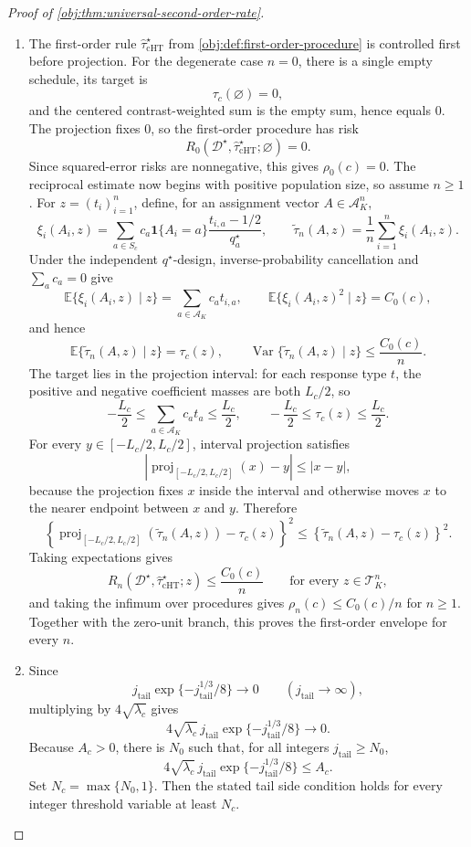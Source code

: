 \begin{proof}[Proof of \cref{obj:thm:universal-second-order-rate}]
\begin{enumerate}
\item The first-order rule \(\widehat\tau_{\mathrm{cHT}}^\star\) from \cref{obj:def:first-order-procedure} is controlled first before projection. For the degenerate case \(n=0\), there is a single empty schedule, its target is
\[
\tau_c(\varnothing)=0,
\]
and the centered contrast-weighted sum is the empty sum, hence equals \(0\). The projection fixes \(0\), so the first-order procedure has risk
\[
R_0(\mathcal D^\star,\widehat\tau_{\mathrm{cHT}}^\star;\varnothing)=0.
\]
Since squared-error risks are nonnegative, this gives \(\rho_0(c)=0\). The reciprocal estimate now begins with positive population size, so assume \(n\ge 1\). For \(z=(t_i)_{i=1}^n\), define, for an assignment vector \(A\in\mathcal A_K^n\),
\[
\xi_i(A_i,z)
=
\sum_{a\in S_c}
 c_a\mathbf 1\{A_i=a\}\frac{t_{i,a}-1/2}{q_a^\star},
\qquad
\widetilde\tau_n(A,z)=\frac1n\sum_{i=1}^n\xi_i(A_i,z).
\]
Under the independent \(q^\star\)-design, inverse-probability cancellation and \(\sum_a c_a=0\) give
\[
\mathbb E\{\xi_i(A_i,z)\mid z\}
=
\sum_{a\in\mathcal A_K} c_a t_{i,a},
\qquad
\mathbb E\{\xi_i(A_i,z)^2\mid z\}=C_0(c),
\]
and hence
\[
\mathbb E\{\widetilde\tau_n(A,z)\mid z\}=\tau_c(z),
\qquad
\operatorname{Var}\{\widetilde\tau_n(A,z)\mid z\}\le \frac{C_0(c)}{n}.
\]
The target lies in the projection interval: for each response type \(t\), the positive and negative coefficient masses are both \(L_c/2\), so
\[
-\frac{L_c}{2}
\le
\sum_{a\in\mathcal A_K}c_a t_a
\le
\frac{L_c}{2},
\qquad
-\frac{L_c}{2}\le \tau_c(z)\le \frac{L_c}{2}.
\]
For every \(y\in[-L_c/2,L_c/2]\), interval projection satisfies
\[
\left|\operatorname{proj}_{[-L_c/2,L_c/2]}(x)-y\right|\le |x-y|,
\]
because the projection fixes \(x\) inside the interval and otherwise moves \(x\) to the nearer endpoint between \(x\) and \(y\). Therefore
\[
\left\{\operatorname{proj}_{[-L_c/2,L_c/2]}(\widetilde\tau_n(A,z))-\tau_c(z)\right\}^2
\le
\left\{\widetilde\tau_n(A,z)-\tau_c(z)\right\}^2.
\]
Taking expectations gives
\[
R_n(\mathcal D^\star,\widehat\tau_{\mathrm{cHT}}^\star;z)\le \frac{C_0(c)}{n}
\qquad\text{for every }z\in\mathcal T_K^n,
\]
and taking the infimum over procedures gives \(\rho_n(c)\le C_0(c)/n\) for \(n\ge1\). Together with the zero-unit branch, this proves the first-order envelope for every \(n\).

\item Since
\[
j_{\mathrm{tail}}\exp\{-j_{\mathrm{tail}}^{1/3}/8\}\longrightarrow 0
\qquad(j_{\mathrm{tail}}\to\infty),
\]
multiplying by \(4\sqrt{\lambda_c}\) gives
\[
4\sqrt{\lambda_c}\,j_{\mathrm{tail}}\exp\{-j_{\mathrm{tail}}^{1/3}/8\}\longrightarrow 0 .
\]
Because \(A_c>0\), there is \(N_0\) such that, for all integers \(j_{\mathrm{tail}}\ge N_0\),
\[
4\sqrt{\lambda_c}\,j_{\mathrm{tail}}\exp\{-j_{\mathrm{tail}}^{1/3}/8\}\le A_c .
\]
Set \(N_c=\max\{N_0,1\}\). Then the stated tail side condition holds for every integer threshold variable at least \(N_c\).


\end{enumerate}
\end{proof}
